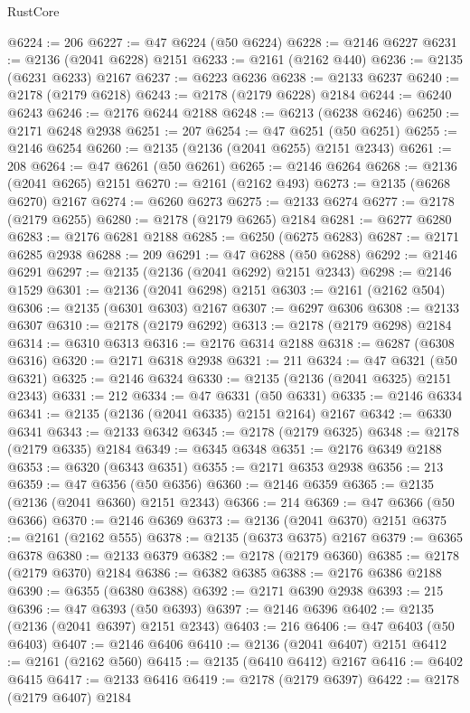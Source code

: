 \begin{lexlean}{RustCore}
\begin{coremodule}
@6224 := 206
@6227 := @47 @6224 (@50 @6224)
@6228 := @2146 @6227
@6231 := @2136 (@2041 @6228) @2151
@6233 := @2161 (@2162 @440)
@6236 := @2135 (@6231 @6233) @2167
@6237 := @6223 @6236
@6238 := @2133 @6237
@6240 := @2178 (@2179 @6218)
@6243 := @2178 (@2179 @6228) @2184
@6244 := @6240 @6243
@6246 := @2176 @6244 @2188
@6248 := @6213 (@6238 @6246)
@6250 := @2171 @6248 @2938
@6251 := 207
@6254 := @47 @6251 (@50 @6251)
@6255 := @2146 @6254
@6260 := @2135 (@2136 (@2041 @6255) @2151 @2343)
@6261 := 208
@6264 := @47 @6261 (@50 @6261)
@6265 := @2146 @6264
@6268 := @2136 (@2041 @6265) @2151
@6270 := @2161 (@2162 @493)
@6273 := @2135 (@6268 @6270) @2167
@6274 := @6260 @6273
@6275 := @2133 @6274
@6277 := @2178 (@2179 @6255)
@6280 := @2178 (@2179 @6265) @2184
@6281 := @6277 @6280
@6283 := @2176 @6281 @2188
@6285 := @6250 (@6275 @6283)
@6287 := @2171 @6285 @2938
@6288 := 209
@6291 := @47 @6288 (@50 @6288)
@6292 := @2146 @6291
@6297 := @2135 (@2136 (@2041 @6292) @2151 @2343)
@6298 := @2146 @1529
@6301 := @2136 (@2041 @6298) @2151
@6303 := @2161 (@2162 @504)
@6306 := @2135 (@6301 @6303) @2167
@6307 := @6297 @6306
@6308 := @2133 @6307
@6310 := @2178 (@2179 @6292)
@6313 := @2178 (@2179 @6298) @2184
@6314 := @6310 @6313
@6316 := @2176 @6314 @2188
@6318 := @6287 (@6308 @6316)
@6320 := @2171 @6318 @2938
@6321 := 211
@6324 := @47 @6321 (@50 @6321)
@6325 := @2146 @6324
@6330 := @2135 (@2136 (@2041 @6325) @2151 @2343)
@6331 := 212
@6334 := @47 @6331 (@50 @6331)
@6335 := @2146 @6334
@6341 := @2135 (@2136 (@2041 @6335) @2151 @2164) @2167
@6342 := @6330 @6341
@6343 := @2133 @6342
@6345 := @2178 (@2179 @6325)
@6348 := @2178 (@2179 @6335) @2184
@6349 := @6345 @6348
@6351 := @2176 @6349 @2188
@6353 := @6320 (@6343 @6351)
@6355 := @2171 @6353 @2938
@6356 := 213
@6359 := @47 @6356 (@50 @6356)
@6360 := @2146 @6359
@6365 := @2135 (@2136 (@2041 @6360) @2151 @2343)
@6366 := 214
@6369 := @47 @6366 (@50 @6366)
@6370 := @2146 @6369
@6373 := @2136 (@2041 @6370) @2151
@6375 := @2161 (@2162 @555)
@6378 := @2135 (@6373 @6375) @2167
@6379 := @6365 @6378
@6380 := @2133 @6379
@6382 := @2178 (@2179 @6360)
@6385 := @2178 (@2179 @6370) @2184
@6386 := @6382 @6385
@6388 := @2176 @6386 @2188
@6390 := @6355 (@6380 @6388)
@6392 := @2171 @6390 @2938
@6393 := 215
@6396 := @47 @6393 (@50 @6393)
@6397 := @2146 @6396
@6402 := @2135 (@2136 (@2041 @6397) @2151 @2343)
@6403 := 216
@6406 := @47 @6403 (@50 @6403)
@6407 := @2146 @6406
@6410 := @2136 (@2041 @6407) @2151
@6412 := @2161 (@2162 @560)
@6415 := @2135 (@6410 @6412) @2167
@6416 := @6402 @6415
@6417 := @2133 @6416
@6419 := @2178 (@2179 @6397)
@6422 := @2178 (@2179 @6407) @2184

\end{coremodule}
\end{lexlean}
